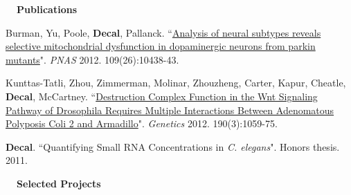 \documentclass[a4paper,12pt]{article}
\newcommand{\resheading}[1]{{\vspace*{.001in} \colorbox{mygrey}{\begin{minipage}{\textwidth}{\textmd{\large \textbf{#1} \vphantom{p\^{E}}}}\end{minipage}}} }
\newcommand{\tabitem}{~~\llap{\textbullet}~~}
\begin{document}
\resheading{~~Publications}
\vspace{-1em}
{\setlength{\parskip}{8pt}

      Burman, Yu, Poole, \textbf{Decal}, Pallanck. ``\href{http://www.pnas.org/content/early/2012/06/12/1120688109}{Analysis of neural subtypes reveals selective mitochondrial dysfunction in dopaminergic neurons from parkin mutants}". \textit{PNAS} 2012. 109(26):10438-43.
      
      Kunttas-Tatli, Zhou, Zimmerman, Molinar, Zhouzheng, Carter, Kapur, Cheatle, \textbf{Decal}, McCartney. ``\href{http://www.genetics.org/content/190/3/1059.full}{Destruction Complex Function in the Wnt Signaling Pathway of Drosophila Requires Multiple Interactions Between Adenomatous Polyposis Coli 2 and Armadillo}". \textit{Genetics} 2012. 190(3):1059-75.
      
      \textbf{\textbf{Decal}}. ``Quantifying Small RNA Concentrations in \textit{C. elegans}". Honors thesis. 2011.\\
      
}
      \resheading{~~Selected Projects}
      \vspace{-1.5em}
      \setlength{\extrarowheight}{.5em}  %
\end{document}
